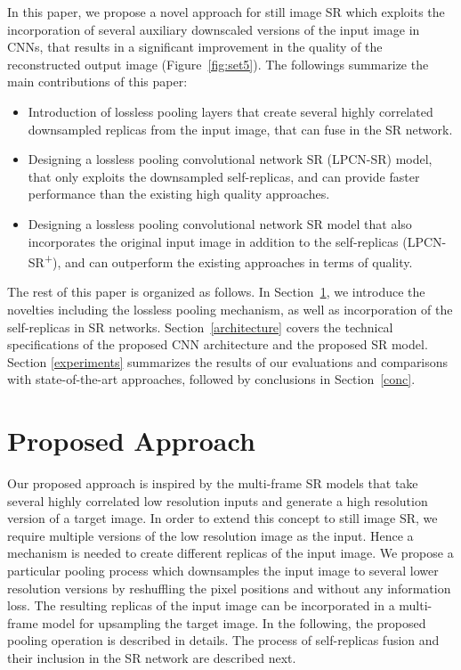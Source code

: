 \documentclass[10pt,twocolumn,letterpaper]{article}
\begin{document}
In this paper, we propose a novel approach for still image SR which exploits the incorporation of 
several auxiliary downscaled versions of the input image in CNNs, that results in a significant 
improvement in the quality of the reconstructed output image (Figure~\ref{fig:set5}). The followings summarize the main contributions 
of this paper:
\begin{itemize}
    \item Introduction of lossless pooling layers that create several highly correlated downsampled replicas
from the input image, that can fuse in the SR network. 
    \item Designing a lossless pooling convolutional network SR (LPCN-SR) model, that only exploits the
downsampled self-replicas, and can provide faster performance than the existing high quality approaches.
    \item Designing a lossless pooling convolutional network SR model that also incorporates the original input
image in addition to the self-replicas (LPCN-SR\textsuperscript{+}), and can outperform the existing approaches 
in terms of quality.
\end{itemize}

The rest of this paper is organized as follows. In Section~\ref{proposed}, we introduce the novelties
including the lossless pooling mechanism, as well as incorporation of the self-replicas in SR networks. 
Section~\ref{architecture} covers the technical specifications of the proposed CNN architecture and the 
proposed SR model. Section \ref{experiments} summarizes the results of our evaluations and comparisons 
with state-of-the-art approaches, followed by conclusions in Section~\ref{conc}.


\section{Proposed Approach}
\label{proposed}
Our proposed approach is inspired by the multi-frame SR models that take several highly 
correlated low resolution inputs and generate a high resolution version of a target image. In
order to extend this concept to still image SR, we require multiple versions of the low resolution
image as the input. Hence a mechanism is needed to create different replicas of the input 
image. We propose a particular pooling process which downsamples the input image to several lower
resolution versions by reshuffling the pixel positions and without any information loss. The resulting
replicas of the input image can be incorporated in a multi-frame model for upsampling the target image.
In the following, the proposed pooling operation is described in details. The process of self-replicas
fusion and their inclusion in the SR network are described next.
\end{document}
